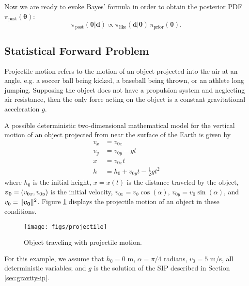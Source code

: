 Now we are ready to evoke Bayes' formula in order to obtain the posterior PDF 
$\pi_{\text{post}}(\boldsymbol{\theta})$:
\begin{equation}\label{eq-Bayes-g}
\pi_{\text{post}}(\boldsymbol{\theta}|\mathbf{d})\varpropto  \pi_{\text{like}}(\mathbf{d}|\boldsymbol{\theta}) \, \pi_{\text{prior}}(\boldsymbol{\theta}).
\end{equation}


\subsection{Statistical Forward Problem}

Projectile motion refers to the motion of an object projected into the air at an angle, e.g. a soccer ball 
being kicked, a baseball being thrown, or an athlete long jumping. Supposing the object does not have a 
propulsion system and neglecting air resistance, then the only force acting on the object is a 
constant gravitational acceleration $g$.


A possible deterministic two-dimensional mathematical model for the vertical motion of an object projected 
from near the surface of the Earth is given by
\begin{align}\label{eq:fwd01}
v_x &= v_{0x} \\ %
v_y &= v_{0y} - gt \\ %
  x &= v_{0x}t \\ %
  h &= h_0 + v_{0y}t - \frac{1}{2} g t^2  %
\end{align}
where
$h_0$ is the initial height, $x=x(t)$ is the distance traveled by the object, $\mbox{\boldmath$ v_0 $}=(v_{0x},v_{0y})$ 
is the initial velocity, $v_{0x} = v_{0} \cos(\alpha)$, $v_{0y} = v_{0} \sin(\alpha)$, and $v_0=\|\mbox{\boldmath$ v_0 $}\|^2$.
%
Figure \ref{fig:projectile} displays the projectile motion of an object in these conditions.
\begin{figure}[!ht]
\centering
\texttt{[image: figs/projectile]}
\vspace*{-8pt}
\caption{Object traveling with projectile motion. }
\label{fig:projectile}
\end{figure}


For this example, we assume that $h_0 =0$ m, $\alpha = \pi/4$ radians, $v_0 = 5$ m/s, all 
deterministic variables; and $g$ is the solution of the SIP described in Section \ref{sec:gravity-ip}.

